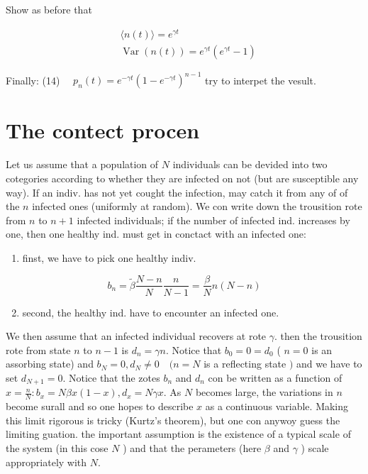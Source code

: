 Show as before that

$$ 
\begin{aligned}
& \langle n(t)\rangle=e^{\gamma t} \\
& \operatorname{Var}(n(t))=e^{\gamma t}\left(e^{\gamma t}-1\right)
\end{aligned}
$$ 

Finally:
(14) $\quad p_{n}(t)=e^{-\gamma t}\left(1-e^{-\gamma t}\right)^{n-1}$ try to interpet the vesult.

\section*{The contect procen}
Let us assume that a population of $N$ individuals can be devided into two cotegories according to whether they are infected on not (but are susceptible any way). If an indiv. has not yet cought the infection, may catch it from any of of the $n$ infected ones (uniformly at random).
We con write down the trousition rote from $n$ to $n+1$ infected individuals; if the number of infected ind. increases by one, then one healthy ind. must get in conctact with an infected one:

\begin{enumerate}
  \item finst, we have to pick one healthy indiv.
\end{enumerate}

$$ b_{n}=\tilde{\beta} \frac{N-n}{N} \frac{n}{N-1}=\frac{\beta}{N} n(N-n) $$ 

\begin{enumerate}
  \setcounter{enumi}{1}
  \item second, the healthy ind. have to encounter an infected one.
\end{enumerate}

We then assume that an infected individual recovers at rote $\gamma$. then the trousition rote from state $n$ to $n-1$ is $d_{n}=\gamma n$. Notice that $b_{0}=0=d_{0}$ ( $n=0$ is an assorbing state) and $b_{N}=0, d_{N} \neq 0 \quad (n=N$ is a reflecting state $)$ and we have to set $d_{N+1}=0$.
Notice that the zotes $b_{n}$ and $d_{n}$ con be written as a function of $x=\frac{n}{N}: b_{x}=N \beta x(1-x), d_{x}=N \gamma x$.
As $N$ becomes large, the variations in $n$ become surall and so one hopes to describe $x$ as a continuous variable. Making this limit rigorous is tricky (Kurtz's theorem), but one con anywoy guess the limiting guation. the important assumption is the existence of a typical scale of the system (in this cose $N$ ) and that the perameters (here $\beta$ and $\gamma$ ) scale appropriately with $N$.

